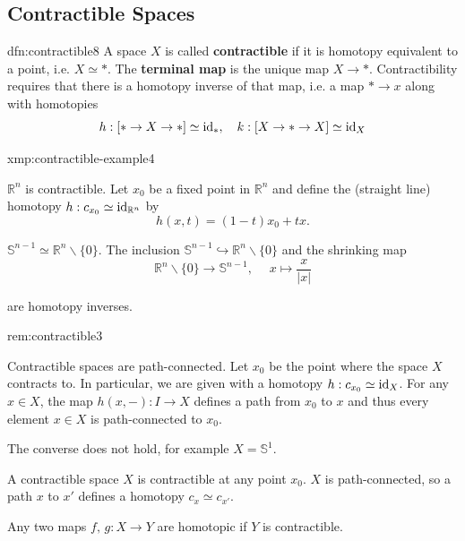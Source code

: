 \documentclass[landscape, 8pt]{extarticle}
\begin{document}
\begin{multicols*}{3}
\section{Contractible Spaces}
\vspace{-5pt}
\begin{dfn}{dfn:contractible}{8}
	A space $X$ is called \textbf{contractible} if it is homotopy equivalent to a point, i.e. $X \simeq \ast$.
	\tcbline
	The \textbf{terminal map} is the unique map $X \to \ast$. Contractibility requires that there is a homotopy inverse of that map, i.e. a map $\ast \to x$ along with homotopies
	\begin{equation}\label{eq:contractibility}
		h : [\ast \to X \to \ast] \simeq \operatorname{id}_{\ast},\quad k : [X \to \ast \to X] \simeq \operatorname{id}_{X}
	\end{equation}
\end{dfn}

\begin{xmp}{xmp:contractible-example}{4}
	\begin{enumerate-zero}
	    \item $\mathbb{R}^{n}$ is contractible. Let $x_{0}$ be a fixed point in $\mathbb{R}^{n}$ and define the (straight line) homotopy $h : c_{x_{0}} \simeq \operatorname{id}_{\mathbb{R}^{n}}$ by
			\[h(x, t) = (1 - t)x_{0} + tx.\]
		\item $\mathbb{S}^{n-1} \simeq \mathbb{R}^{n} \backslash \{0\}$. The inclusion $\mathbb{S}^{n-1} \hookrightarrow \mathbb{R}^{n}\backslash \{0\}$ and the shrinking map
			\vspace{-2pt}
			\[\mathbb{R}^{n}\backslash \{0\} \to \mathbb{S}^{n-1},\;\quad x \mapsto \frac{x}{\lvert x \rvert}\]
			\par\vspace{-7pt}
			are homotopy inverses.
	\end{enumerate-zero}
\end{xmp}

\begin{rem}{rem:contractible}{3}
	\begin{enumerate-zero}
	    \item Contractible spaces are path-connected. Let $x_{0}$ be the point where the space $X$ contracts to. In particular, we are given with a homotopy $h : c_{x_{0}} \simeq \operatorname{id}_{X}$. For any $x\in X$, the map $h(x, -) : I \to X$ defines a path from $x_{0}$ to $x$ and thus every element $x\in X$ is path-connected to $x_{0}$.
	    \item The converse does not hold, for example $X = \mathbb{S}^{1}$.
	    \item A contractible space $X$ is contractible at any point $x_{0}$. $X$ is path-connected, so a path $x$ to $x'$ defines a homotopy $c_{x} \simeq c_{x'}$.
	    \item Any two maps $f,\,g : X \to Y$ are homotopic if $Y$ is contractible.
	\end{enumerate-zero}
\end{rem}


\end{multicols*}
\end{document}
